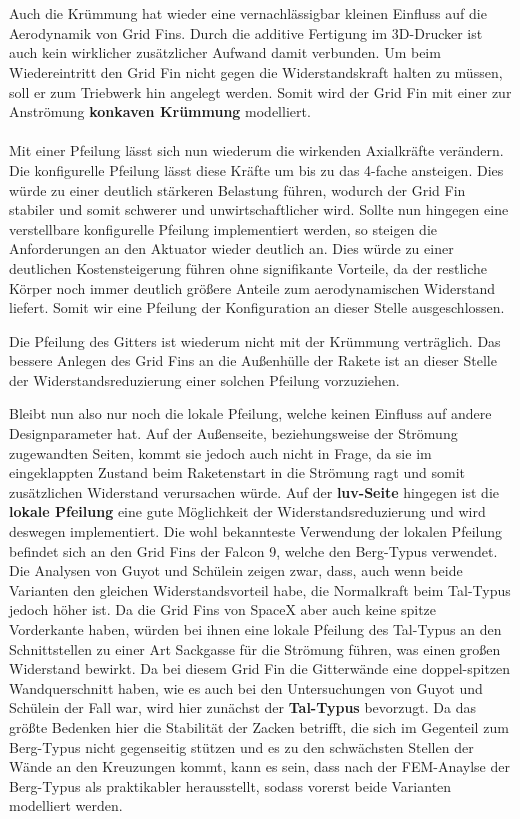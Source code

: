 \\~\\
Auch die Krümmung hat wieder eine vernachlässigbar kleinen Einfluss auf die Aerodynamik von Grid Fins. Durch die additive Fertigung im 3D-Drucker ist auch kein wirklicher zusätzlicher Aufwand damit verbunden. Um beim Wiedereintritt den Grid Fin nicht gegen die Widerstandskraft halten zu müssen, soll er zum Triebwerk hin angelegt werden. Somit wird der Grid Fin mit einer zur Anströmung \textbf{konkaven Krümmung} modelliert.
\\~\\
Mit einer Pfeilung lässt sich nun wiederum die wirkenden Axialkräfte verändern. Die konfigurelle Pfeilung lässt diese Kräfte um bis zu das 4-fache ansteigen. Dies würde zu einer deutlich stärkeren Belastung führen, wodurch der Grid Fin stabiler und somit schwerer und unwirtschaftlicher wird. Sollte nun hingegen eine verstellbare konfigurelle Pfeilung implementiert werden, so steigen die Anforderungen an den Aktuator wieder deutlich an. Dies würde zu einer deutlichen Kostensteigerung führen ohne signifikante Vorteile, da der restliche Körper noch immer deutlich größere Anteile zum aerodynamischen Widerstand liefert. Somit wir eine Pfeilung der Konfiguration an dieser Stelle ausgeschlossen.

Die Pfeilung des Gitters ist wiederum nicht mit der Krümmung verträglich. Das bessere Anlegen des Grid Fins an die Außenhülle der Rakete ist an dieser Stelle der Widerstandsreduzierung einer solchen Pfeilung vorzuziehen.

Bleibt nun also nur noch die lokale Pfeilung, welche keinen Einfluss auf andere Designparameter hat. Auf der Außenseite, beziehungsweise der Strömung zugewandten Seiten, kommt sie jedoch auch nicht in Frage, da sie im eingeklappten Zustand beim Raketenstart in die Strömung ragt und somit zusätzlichen Widerstand verursachen würde. Auf der \textbf{luv-Seite} hingegen ist die \textbf{lokale Pfeilung} eine gute Möglichkeit der Widerstandsreduzierung und wird deswegen implementiert. Die wohl bekannteste Verwendung der lokalen Pfeilung befindet sich an den Grid Fins der Falcon 9, welche den Berg-Typus verwendet. Die Analysen von Guyot und Schülein \cite{PeakValley} zeigen zwar, dass, auch wenn beide Varianten den gleichen Widerstandsvorteil habe, die Normalkraft beim Tal-Typus jedoch höher ist. Da die Grid Fins von SpaceX aber auch keine spitze Vorderkante haben, würden bei ihnen eine lokale Pfeilung des Tal-Typus an den Schnittstellen zu einer Art Sackgasse für die Strömung führen, was einen großen Widerstand bewirkt. Da bei diesem Grid Fin die Gitterwände eine doppel-spitzen Wandquerschnitt haben, wie es auch bei den Untersuchungen von Guyot und Schülein der Fall war, wird hier zunächst der \textbf{Tal-Typus} bevorzugt. Da das größte Bedenken hier die Stabilität der Zacken betrifft, die sich im Gegenteil zum Berg-Typus nicht gegenseitig stützen und es zu den schwächsten Stellen der Wände an den Kreuzungen kommt, kann es sein, dass nach der FEM-Anaylse der Berg-Typus als praktikabler herausstellt, sodass vorerst beide Varianten modelliert werden.
